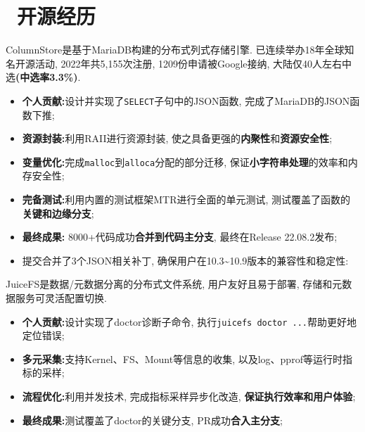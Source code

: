 \documentclass{resume}
\begin{document}
\section{\faUsers\ 开源经历}

ColumnStore是基于MariaDB构建的分布式列式存储引擎. 已连续举办18年全球知名开源活动, 2022年共5,155次注册, 1209份申请被Google接纳, 大陆仅40人左右中选\textbf{(中选率3.3\%)}.
\begin{itemize}[parsep=0.2ex]
  \item \textbf{个人贡献:}设计并实现了\verb|SELECT|子句中的JSON函数, 完成了MariaDB的JSON函数下推;
  \item \textbf{资源封装:}利用RAII进行资源封装, 使之具备更强的\textbf{内聚性}和\textbf{资源安全性};
  \item \textbf{变量优化:}完成\verb|malloc|到\verb|alloca|分配的部分迁移, 保证\textbf{小字符串处理}的效率和内存安全性;
  \item \textbf{完备测试:}利用内置的测试框架MTR进行全面的单元测试, 测试覆盖了函数的\textbf{关键和边缘分支};
  \item \textbf{最终成果:} 8000+代码成功\textbf{合并到代码主分支}, 最终在Release 22.08.2发布;\enspace{}
  \item 提交合并了3个JSON相关补丁, 确保用户在10.3\textasciitilde 10.9版本的兼容性和稳定性:\enspace{}
\end{itemize}

JuiceFS是数据/元数据分离的分布式文件系统, 用户友好且易于部署, 存储和元数据服务可灵活配置切换.
\begin{itemize}[parsep=0.2ex]
  \item \textbf{个人贡献:}设计实现了doctor诊断子命令, 执行\verb|juicefs doctor ...|帮助更好地定位错误;
  \item \textbf{多元采集:}支持Kernel、FS、Mount等信息的收集, 以及log、pprof等运行时指标的采样;
  \item \textbf{流程优化:}利用并发技术, 完成指标采样异步化改造, \textbf{保证执行效率和用户体验};
  \item \textbf{最终成果:}测试覆盖了doctor的关键分支, PR成功\textbf{合入主分支};\enspace{}
\end{itemize}
\end{document}
